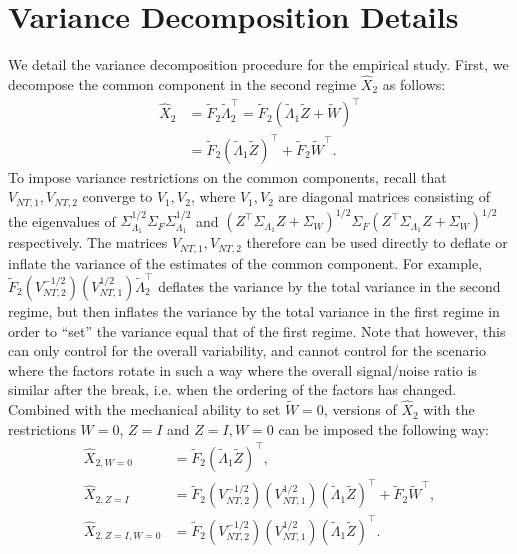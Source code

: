 \documentclass[12pt]{article}
\newcommand*{\tran}{\intercal}
\theoremstyle{plain}
\numberwithin{equation}{section}
\begin{document}
\newpage 

\section{Variance Decomposition Details}
\label{app:variance_decomposition}
We detail the variance decomposition procedure for the empirical study. First, we decompose the common component in the second regime $\widehat{X}_2$ as follows:
\begin{align}
\widehat{X}_2 
&= \tilde{F}_2 \tilde{\Lambda}_2^\tran = 
 \tilde{F}_2 \left(\tilde{\Lambda}_1 \tilde{Z} + \tilde{W} \right)^\tran \\
&= \tilde{F}_2 \left(\tilde{\Lambda}_1 \tilde{Z} \right)^\tran +
\tilde{F}_{2} \tilde{W}^\tran.
\end{align}
To impose variance restrictions on the common components, recall that $V_{NT, 1}, V_{NT, 2}$ converge to $V_1, V_2$, where $V_1, V_2$ are diagonal matrices consisting of the eigenvalues of $\Sigma_{\Lambda_1}^{1/2} \Sigma_F \Sigma_{\Lambda_1}^{1/2}$ and $(Z^\tran \Sigma_{\Lambda_1} Z + \Sigma_W)^{1/2} \Sigma_F (Z^\tran \Sigma_{\Lambda_1} Z + \Sigma_W)^{1/2}$ respectively. The matrices $V_{NT, 1}, V_{NT, 2}$ therefore can be used directly to deflate or inflate the variance of the estimates of the common component. For example, $\tilde{F}_2 \left( V_{NT, 2}^{-1/2} \right) \left( V_{NT, 1}^{1/2} \right)  \tilde{\Lambda}_2^\tran$ deflates the variance by the total variance in the second regime, but then inflates the variance by the total variance in the first regime in order to ``set'' the variance equal that of the first regime. Note that however, this can only control for the overall variability, and cannot control for the scenario where the factors rotate in such a way where the overall signal/noise ratio is similar after the break, i.e. when the ordering of the factors has changed. Combined with the mechanical ability to set $\tilde{W} = 0$, versions of $\widehat{X}_2$ with the restrictions $W = 0$, $Z = I$ and $Z = I, W = 0$ can be imposed the following way:
\begin{align*}
\widehat{X}_{2, W = 0} 
&= \tilde{F}_2 \left(\tilde{\Lambda}_1 \tilde{Z} \right)^\tran, \\
\widehat{X}_{2, Z = I} 
&= \tilde{F}_2 \left( V_{NT, 2}^{-1/2} \right) \left( V_{NT, 1}^{1/2} \right)  \left(\tilde{\Lambda}_1 \tilde{Z} \right)^\tran +
\tilde{F}_{2} \tilde{W}^\tran, \\
\widehat{X}_{2, Z = I, W = 0} 
&= \tilde{F}_2 \left( V_{NT, 2}^{-1/2} \right) \left( V_{NT, 1}^{1/2} \right)  \left(\tilde{\Lambda}_1 \tilde{Z} \right)^\tran.
\end{align*}
\end{document}
